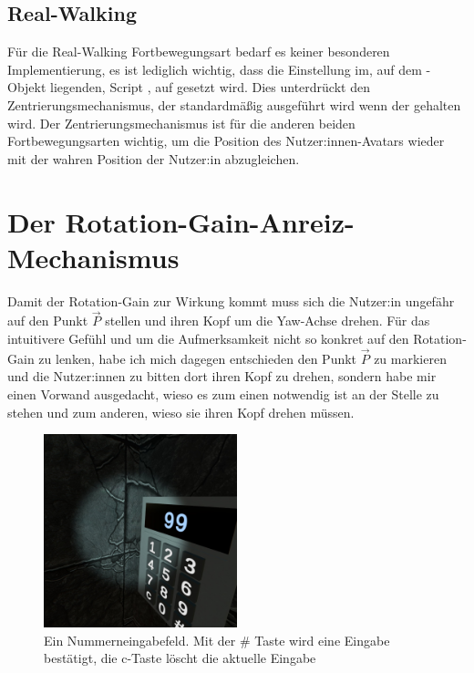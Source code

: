 \subsection{Real-Walking}\label{subsec:real-walk-implementation}
    Für die Real-Walking Fortbewegungsart bedarf es keiner besonderen Implementierung, es ist lediglich wichtig, dass die Einstellung  im, auf dem -Objekt
    liegenden, Script , auf  gesetzt wird. Dies unterdrückt den Zentrierungsmechanismus, der standardmäßig ausgeführt wird wenn der  gehalten wird. Der Zentrierungsmechanismus ist für die anderen beiden Fortbewegungsarten wichtig, um die Position des Nutzer:innen-Avatars wieder mit der wahren Position der Nutzer:in abzugleichen.

\section{Der Rotation-Gain-Anreiz-Mechanismus}
\label{sec:rotgaininc}

Damit der Rotation-Gain zur Wirkung kommt muss sich die Nutzer:in ungefähr auf den Punkt $\vec{P}$ stellen und ihren Kopf um die Yaw-Achse drehen.
Für das intuitivere Gefühl und um die Aufmerksamkeit nicht so konkret auf den Rotation-Gain zu lenken, habe ich mich dagegen entschieden den Punkt $\vec{P}$ zu markieren und die Nutzer:innen zu bitten dort ihren Kopf zu drehen, sondern habe mir einen Vorwand ausgedacht, wieso es zum einen notwendig ist an der Stelle zu stehen und zum anderen, wieso sie ihren Kopf drehen müssen.

\begin{figure}[!h]
    \centering
    \includegraphics[width=0.5\textwidth]{vrscreenshots/numpad.jpg}
    \caption{Ein Nummerneingabefeld. Mit der \# Taste wird eine Eingabe bestätigt, die c-Taste löscht die aktuelle Eingabe}\label{figure:numpad}
\end{figure}


